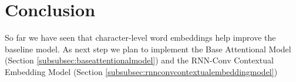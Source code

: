 \section{Conclusion}
\label{sec:conclusion}

So far we have seen that character-level word embeddings help improve the baseline model. As next step we plan to implement the Base Attentional Model (Section \ref{subsubsec:baseattentionalmodel}) and the RNN-Conv Contextual Embedding Model (Section \ref{subsubsec:rnnconvcontextualembeddingmodel})
